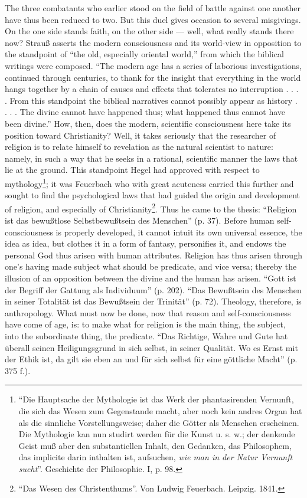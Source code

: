\documentclass[12pt,a4paper]{book}
\newcommand{\opage}[1]{\marginnote{\footnotesize\textit{[#1]}}}
\begin{document}
The three combatants who earlier stood on the field of battle
against one another have thus been reduced to two. But
this duel gives occasion to several misgivings.
On the one side stands faith, on the other side --- well,
what really stands there now? Strauß asserts the modern consciousness
and its world-view in opposition to the standpoint of ``the old,
especially oriental world,'' from which the biblical
writings were composed. ``The modern age has a series of
laborious investigations, continued through centuries,
to thank for the insight that everything in the world hangs
together by a chain of causes and effects that tolerates no
interruption . . . . From this standpoint the
biblical narratives cannot possibly appear as history . . . . The
divine cannot have happened thus; what happened thus
cannot have been divine.'' How, then, does the modern,
scientific consciousness here take its position toward Christianity?
Well, it takes seriously that the researcher of religion is to
relate himself to revelation as the natural scientist to nature:
namely, in such a way that he seeks in a rational, scientific manner
the laws that lie at the ground. This standpoint
Hegel had approved with respect to mythology\footnote{``Die Hauptsache der Mythologie ist das Werk der phantasirenden
Vernunft, die sich das Wesen zum Gegenstande macht, aber noch
kein andres Organ hat als die sinnliche Vorstellungsweise; daher die
Götter als Menschen erscheinen. Die Mythologie
kan nun studirt
werden für die Kunst u. s. w.; der denkende Geist muß aber den substantiellen
Inhalt, den Gedanken, das Philosophem, das implicite
darin inthalten ist, aufsuchen, \emph{wie man in der Natur Vernunft
sucht}''. Geschichte der Philosophie. I, p. 98.}; it was Feuerbach who
\opage{37}\setcounter{footnote}{0}%
with great acuteness carried this further and sought to find
the psychological laws that had guided the origin and development
of religion, and especially of Christianity\footnote{``Das Wesen des Christenthums''. Von Ludwig Feuerbach. Leipzig.
1841.}. Thus he came
to the thesis: ``Religion ist das bewußtlose Selbstbewußtsein
des Menschen'' (p. 37). Before human self-consciousness
is properly developed, it cannot intuit its own universal
essence, the idea as idea, but clothes it in a form of fantasy,
personifies it, and endows the personal God thus arisen
with human attributes. Religion has
thus arisen through one's having made subject what
should be predicate, and vice versa; thereby the illusion of
an opposition between the divine and the human has
arisen. ``Gott ist der Begriff der Gattung als Individuum''
(p. 202). ``Das Bewußtsein des Menschen in seiner
Totalität ist das Bewußtsein der Trinität'' (p. 72). Theology,
therefore, is anthropology. What must now be done,
now that reason and self-consciousness have come of age, is:
to make what for religion is the main thing, the subject,
into the subordinate thing, the predicate. ``Das Richtige, Wahre und Gute
hat überall seinen Heiligungsgrund in sich selbst, in seiner
Qualität. Wo es Ernst mit der Ethik ist, da gilt sie eben an
und für sich selbst für eine göttliche Macht'' (p. 375 f.).
\end{document}
